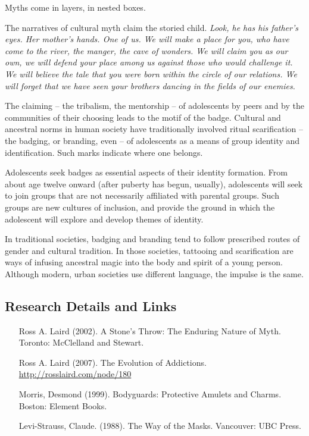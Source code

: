 \documentclass[12pt,DIV9,oneside,headsepline,footsepline]{scrreprt}
\begin{document}
Myths come in layers, in nested boxes.

The narratives of cultural myth claim the storied child. \emph{Look,
he has his father’s eyes. Her mother’s hands. One of us. We will make
a place for you, who have come to the river, the manger, the cave of
wonders. We will claim you as our own, we will defend your place among
us against those who would challenge it. We will believe the tale that
you were born within the circle of our relations. We will forget that
we have seen your brothers dancing in the fields of our enemies.}

The claiming -- the tribalism, the mentorship -- of adolescents by
peers and by the communities of their choosing leads to the motif of
the badge. Cultural and ancestral norms in human society have
traditionally involved ritual scarification -- the badging, or
branding, even -- of adolescents as a means of group identity and
identification. Such marks indicate where one belongs.

Adolescents seek badges as essential aspects of their identity
formation. From about age twelve onward (after puberty has begun,
usually), adolescents will seek to join groups that are not
necessarily affiliated with parental groups. Such groups are new
cultures of inclusion, and provide the ground in which the adolescent
will explore and develop themes of identity.

In traditional societies, badging and branding tend to follow
prescribed routes of gender and cultural tradition. In those
societies, tattooing and scarification are ways of infusing ancestral
magic into the body and spirit of a young person. Although modern,
urban societies use different language, the impulse is the same. 

\subsection{Research Details and Links}

\begin{itemize}
\item [Ross A. Laird] (2002). A Stone's Throw: The Enduring Nature of
Myth. Toronto: McClelland and Stewart.
\item [Ross A. Laird] (2007). The Evolution of Addictions. \\
\url{http://rosslaird.com/node/180}

\item [Morris, Desmond] (1999). Bodyguards: Protective Amulets and
Charms. Boston: Element Books.

\item [Levi-Strauss, Claude.] (1988). The Way of the Masks. Vancouver:
UBC Press.

\end{itemize}
\end{document}
